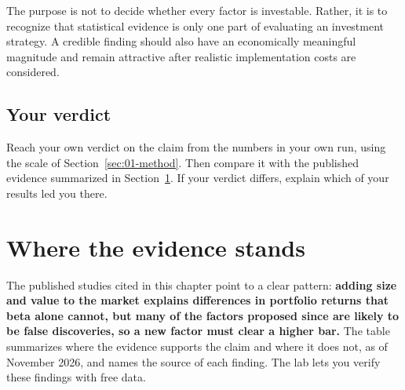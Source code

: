 The purpose is not to decide whether every factor is investable. Rather, it is to recognize that statistical evidence is only one part of evaluating an investment strategy. A credible finding should also have an economically meaningful magnitude and remain attractive after realistic implementation costs are considered.


\subsection*{Your verdict}

Reach your own verdict on the claim from the numbers in your own run, using the scale of Section~\ref{sec:01-method}. Then compare it with the published evidence summarized in Section~\ref{sec:04-verdict}. If your verdict differs, explain which of your results led you there.

\section{Where the evidence stands}
\label{sec:04-verdict}

The published studies cited in this chapter point to a clear pattern: \textbf{adding size and value to the market explains differences in portfolio returns that beta alone cannot, but many of the factors proposed since are likely to be false discoveries, so a new factor must clear a higher bar.} The table summarizes where the evidence supports the claim and where it does not, as of November 2026, and names the source of each finding. The lab lets you verify these findings with free data.

